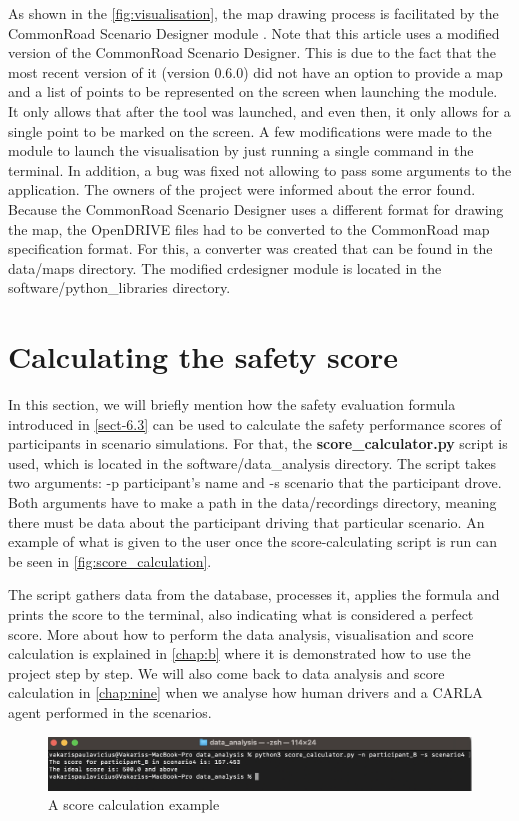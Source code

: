 As shown in the \autoref{fig:visualisation}, the map drawing process is facilitated by the CommonRoad Scenario Designer module \cite{maierhofer2021commonroad}. Note that this article uses a modified version of the CommonRoad Scenario Designer. This is due to the fact that the most recent version of it (version 0.6.0) did not have an option to provide a map and a list of points to be represented on the screen when launching the module. It only allows that after the tool was launched, and even then, it only allows for a single point to be marked on the screen. A few modifications were made to the module to launch the visualisation by just running a single command in the terminal. In addition, a bug was fixed not allowing to pass some arguments to the application. The owners of the project were informed about the error found. Because the CommonRoad Scenario Designer uses a different format for drawing the map, the OpenDRIVE files had to be converted to the CommonRoad map specification format. For this, a converter was created that can be found in the data/maps directory. The modified crdesigner module is located in the software/python\_libraries directory.

\section{Calculating the safety score} \label{sect-7.3}
In this section, we will briefly mention how the safety evaluation formula introduced in \autoref{sect-6.3} can be used to calculate the safety performance scores of participants in scenario simulations. For that, the \textbf{score\_calculator.py} script is used, which is located in the software/data\_analysis directory. The script takes two arguments: -p participant's name and -s scenario that the participant drove. Both arguments have to make a path in the data/recordings directory, meaning there must be data about the participant driving that particular scenario. An example of what is given to the user once the score-calculating script is run can be seen in \autoref{fig:score_calculation}. 

The script gathers data from the database, processes it, applies the formula and prints the score to the terminal, also indicating what is considered a perfect score. More about how to perform the data analysis, visualisation and score calculation is explained in \autoref{chap:b} where it is demonstrated how to use the project step by step. We will also come back to data analysis and score calculation in \autoref{chap:nine} when we analyse how human drivers and a CARLA agent performed in the scenarios.

\begin{figure} [h]
    \centering
    \includegraphics[width = \textwidth]{research_paper/Images/score_calculation.png}
    \caption{A score calculation example}
    \label{fig:score_calculation}
\end{figure}